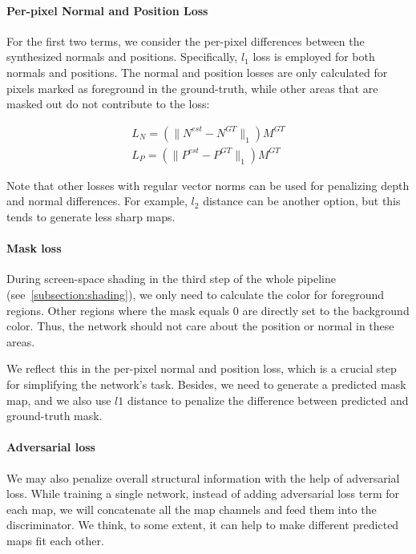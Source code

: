 \documentclass[journal]{vgtc}                %
\begin{document}
\paragraph{Per-pixel Normal and Position Loss}

For the first two terms, we consider the per-pixel differences between the synthesized normals and positions. Specifically, $l_1$ loss is employed for both normals and positions. The normal and position losses are only  calculated for pixels marked as foreground in the ground-truth, while other areas that are masked out do not contribute to the loss: 

\begin{equation}\nonumber
\begin{aligned}
L_{N} = (\|N^{est} - N^{GT}\|_1) M^{GT} \\ 
L_{P} = (\|P^{est} - P^{GT}\|_1) M^{GT}
\end{aligned}
\end{equation}

Note that other losses with regular vector norms can be used for penalizing depth and normal differences. For example, $l_2$ distance can be another option, but this tends to generate less sharp maps. 

\paragraph{Mask loss}
During screen-space shading in the third step of the whole pipeline (see~\ref{subsection:shading}), we only need to calculate the color for foreground regions. Other regions where the mask equals 0 are directly set to the background color. Thus, the network should not care about the position or normal in these areas. 

We reflect this in the per-pixel normal and position loss, which is a crucial step for simplifying the network's task. Besides, we need to generate a predicted mask map, and we also use $l1$ distance to penalize the difference between predicted and ground-truth mask. 

\paragraph{Adversarial loss}
We may also penalize overall structural information with the help of adversarial loss. While training a single network, instead of adding adversarial loss term for each map, we will concatenate all the map channels and feed them into the discriminator. We think, to some extent, it can help to make different predicted maps fit each other.   
\end{document}
